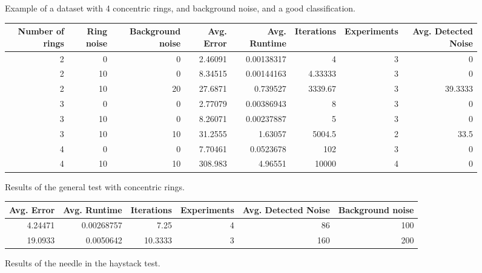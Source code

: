 \documentclass[conference]{IEEEtran}
\begin{document}
\begin{figure}[H]
    \centering
    \resizebox{0.9\linewidth}{!}{}
    \label{fig:concentric_rings}
    \caption{Example of a dataset with 4 concentric rings, and background noise, and a good classification.}
\end{figure}

\begin{figure*}[!ht]
\centering
\begin{tabular}{rrrrrrrr}
    \hline
       Number of rings &   Ring noise &   Background noise &   Avg. Error &   Avg. Runtime &   Iterations &   Experiments &   Avg. Detected Noise \\
    \hline
                     2 &            0 &                  0 &      2.46091 &     0.00138317 &      4       &             3 &                0      \\
                     2 &           10 &                  0 &      8.34515 &     0.00144163 &      4.33333 &             3 &                0      \\
                     2 &           10 &                 20 &     27.6871  &     0.739527   &   3339.67    &             3 &               39.3333 \\
                     3 &            0 &                  0 &      2.77079 &     0.00386943 &      8       &             3 &                0      \\
                     3 &           10 &                  0 &      8.26071 &     0.00237887 &      5       &             3 &                0      \\
                     3 &           10 &                 10 &     31.2555  &     1.63057    &   5004.5     &             2 &               33.5    \\
                     4 &            0 &                  0 &      7.70461 &     0.0523678  &    102       &             3 &                0      \\
                     4 &           10 &                 10 &    308.983   &     4.96551    &  10000       &             4 &                0      \\
    \hline
\end{tabular}
\caption{Results of the general test with concentric rings.}
\end{figure*}
\begin{figure*}[!ht]
    \centering
    \begin{tabular}{rrrrrr}
        \hline
           Avg. Error &   Avg. Runtime &   Iterations &   Experiments &   Avg. Detected Noise &   Background noise \\
        \hline
              4.24471 &     0.00268757 &       7.25   &             4 &                    86 &                100 \\
             19.0933  &     0.0050642  &      10.3333 &             3 &                   160 &                200 \\
        \hline
        \end{tabular}
    \caption{Results of the needle in the haystack test.}
    \end{figure*}
\end{document}
